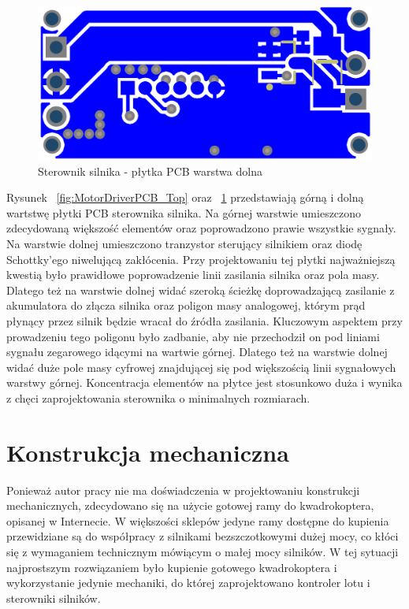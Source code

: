 \begin{figure}[H]
	\centering
	\includegraphics[scale=0.4]{Pictures/MotorDriverPCB_Bottom.png}
		\caption[Sterownik silnika - płytka PCB warstwa dolna]{Sterownik silnika - płytka PCB warstwa dolna}
	\label{fig:MotorDriverPCB_Bottom}
\end{figure}

Rysunek ~\ref{fig:MotorDriverPCB_Top} oraz ~\ref{fig:MotorDriverPCB_Bottom} przedstawiają górną i dolną wartstwę płytki PCB sterownika silnika. Na górnej warstwie umieszczono zdecydowaną większość elementów oraz poprowadzono prawie wszystkie sygnały. Na warstwie dolnej umieszczono tranzystor sterujący silnikiem oraz diodę Schottky'ego niwelującą zakłócenia. Przy projektowaniu tej płytki najważniejszą kwestią było prawidłowe poprowadzenie linii zasilania silnika oraz pola masy. Dlatego też na warstwie dolnej widać szeroką ścieżkę doprowadzającą zasilanie z akumulatora do złącza silnika oraz poligon masy analogowej, którym prąd płynący przez silnik będzie wracał do źródła zasilania. Kluczowym aspektem przy prowadzeniu tego poligonu było zadbanie, aby nie przechodził on pod liniami sygnału zegarowego idącymi na wartwie górnej. Dlatego też na warstwie dolnej widać duże pole masy cyfrowej znajdującej się pod większością linii sygnałowych warstwy górnej. Koncentracja elementów na płytce jest stosunkowo duża i wynika z chęci zaprojektowania sterownika o minimalnych rozmiarach. 

\section{Konstrukcja mechaniczna}

Ponieważ autor pracy nie ma doświadczenia w projektowaniu konstrukcji mechanicznych, zdecydowano się na użycie gotowej ramy do kwadrokoptera, opisanej w Internecie. W większości sklepów jedyne ramy dostępne do kupienia przewidziane są do współpracy z silnikami bezszczotkowymi dużej mocy, co kłóci się z wymaganiem technicznym mówiącym o małej mocy silników. W tej sytuacji najprostszym rozwiązaniem było kupienie gotowego kwadrokoptera i wykorzystanie jedynie mechaniki, do której zaprojektowano kontroler lotu i sterowniki silników. 

